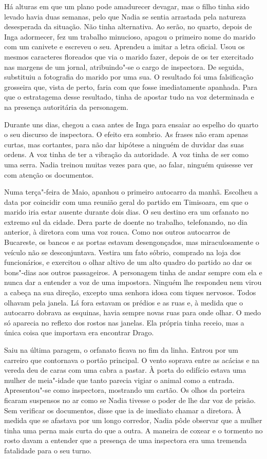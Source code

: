 Há alturas em que um plano pode amadurecer devagar, mas o filho tinha
sido levado havia duas semanas, pelo que Nadia se sentia arrastada pela
natureza desesperada da situação. Não tinha alternativa. Ao serão, no
quarto, depois de Inga adormecer, fez um trabalho minucioso, apagou o
primeiro nome do marido com um canivete e escreveu o seu. Aprendeu a
imitar a letra oficial. Usou os mesmos caracteres floreados que via o
marido fazer, depois de os ter exercitado nas margens de um jornal,
atribuindo"-se o cargo de inspectora. De seguida, substituiu a fotografia do
marido por uma sua. O resultado foi uma falsificação grosseira que,
vista de perto, faria com que fosse imediatamente apanhada. Para que o
estratagema desse resultado, tinha de apostar tudo na voz determinada e
na presença autoritária da personagem.

Durante uns dias, chegou a casa antes de Inga para ensaiar ao espelho do
quarto o seu discurso de inspectora. O efeito era sombrio. As frases não
eram apenas curtas, mas cortantes, para não dar hipótese a ninguém de
duvidar das suas ordens. A voz tinha de ter a vibração da autoridade.
A voz tinha de ser como uma serra. Nadia treinou muitas vezes para que,
ao falar, ninguém quisesse ver com atenção os documentos.

Numa terça"-feira de Maio, apanhou o primeiro autocarro da manhã.
Escolheu a data por coincidir com uma reunião geral do partido em
Timisoara, em que o marido iria estar ausente durante dois dias. O seu
destino era um orfanato no extremo sul da cidade. Dera parte de doente
no
trabalho, telefonando, no dia anterior, à diretora com uma voz rouca.
Como nos outros autocarros de Bucareste, os bancos e as portas estavam
desengonçados, mas miraculosamente o veículo não se desconjuntava.
Vestira um fato sóbrio, comprado na loja dos funcionários, e exercitou o
olhar altivo de um alto quadro do partido ao dar os bons"-dias aos outros passageiros. A personagem tinha de andar sempre com ela
e nunca dar a entender a voz de uma impostora. Ninguém lhe respondeu
nem virou a cabeça na sua direção, excepto uma senhora idosa com tiques
nervosos. Todos olhavam pela janela. Lá fora estavam os prédios e as
ruas e, à medida que o autocarro dobrava as esquinas, havia sempre novas
ruas para onde olhar. O medo só aparecia no reflexo dos rostos nas
janelas. Ela própria tinha receio, mas a única coisa que importava era
encontrar Drago.

Saiu na última paragem, o orfanato ficava no fim da linha. Entrou por um
carreiro que contornava o portão principal. O vento soprava entre as
acácias e na vereda deu de caras com uma cabra a pastar. À porta do
edifício estava uma mulher de meia"-idade que tanto parecia vigiar o
animal como a entrada. Apresentou"-se como inspectora, mostrando um
cartão. Os olhos da porteira ficaram suspensos no ar como se Nadia
tivesse o poder de lhe dar voz de prisão. Sem verificar os documentos,
disse que ia de imediato chamar a diretora. À medida que se afastava
por um longo corredor, Nadia pôde observar que a mulher tinha uma perna
mais curta do que a outra. A maneira de coxear e o tormento no rosto
davam a entender que a presença de uma inspectora era uma tremenda
fatalidade para o seu turno.


